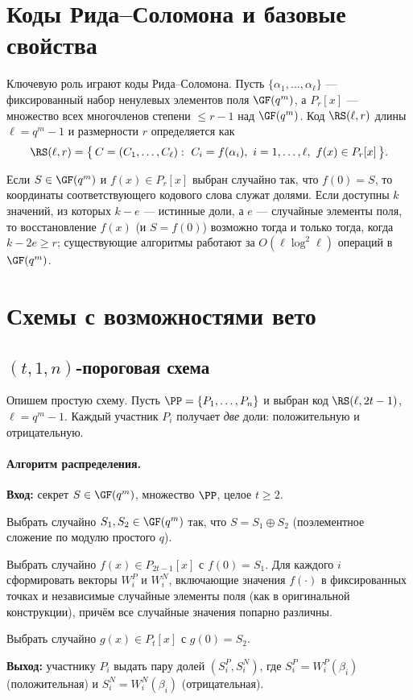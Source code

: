 \documentclass[a4paper,12pt]{article}
\begin{document}
\section{Коды Рида–Соломона и базовые свойства}

Ключевую роль играют коды Рида–Соломона. Пусть $\{\alpha_1,\ldots,\alpha_\ell\}$ --- фиксированный набор ненулевых элементов поля $\GF(q^m)$, а $P_r[x]$ --- множество всех многочленов степени $\le r-1$ над $\GF(q^m)$. Код $\RS(\ell,r)$ длины $\ell=q^m-1$ и размерности $r$ определяется как
\begin{equation}\label{eq:RS}
  \RS(\ell,r)=\bigl\{\, C=(C_1,\ldots,C_\ell):~ C_i=f(\alpha_i),~ i=1,\ldots,\ell,~ f(x)\in P_r[x] \,\bigr\}.
\end{equation}

Если $S\in\GF(q^m)$ и $f(x)\in P_r[x]$ выбран случайно так, что $f(0)=S$, то координаты соответствующего кодового слова служат долями. Если доступны $k$ значений, из которых $k-e$ --- истинные доли, а $e$ --- случайные элементы поля, то восстановление $f(x)$ (и $S=f(0)$) возможно тогда и только тогда, когда $k-2e\ge r$; существующие алгоритмы работают за $O(\ell\log^2 \ell)$ операций в $\GF(q^m)$.

\section{Схемы с возможностями вето}

\subsection{$(t,1,n)$‑пороговая схема}

Опишем простую схему. Пусть $\PP=\{P_1,\ldots,P_n\}$ и выбран код $\RS(\ell,2t-1)$, $\ell=q^m-1$. Каждый участник $P_i$ получает \emph{две} доли: положительную и отрицательную.

\paragraph{Алгоритм распределения.}
\begin{framed}
\textbf{Вход:} секрет $S\in\GF(q^m)$, множество $\PP$, целое $t\ge2$.

Выбрать случайно $S_1,S_2\in\GF(q^m)$ так, что $S=S_1\oplus S_2$ (поэлементное сложение по модулю простого $q$).

Выбрать случайно $f(x)\in P_{2t-1}[x]$ с $f(0)=S_1$. Для каждого $i$ сформировать векторы $W_i^P$ и $W_i^N$, включающие значения $f(\cdot)$ в фиксированных точках и независимые случайные элементы поля (как в оригинальной конструкции), причём все случайные значения попарно различны.

Выбрать случайно $g(x)\in P_t[x]$ с $g(0)=S_2$.

\textbf{Выход:} участнику $P_i$ выдать пару долей $(S_i^P,S_i^N)$, где $S_i^P=W_i^P(\beta_i)$ (положительная) и $S_i^N=W_i^N(\beta_i)$ (отрицательная).
\end{framed}
\end{document}
